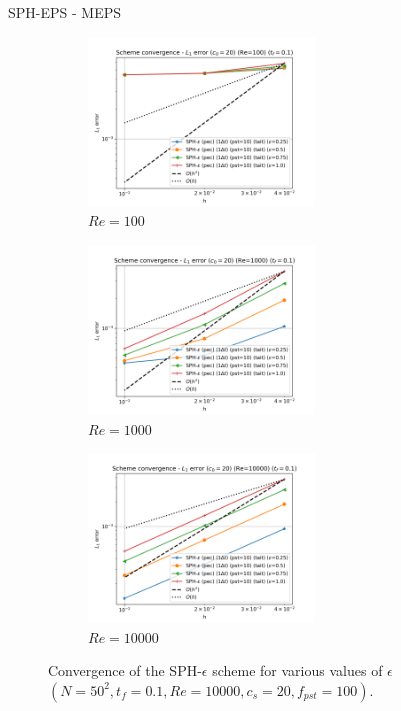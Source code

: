 SPH-EPS - MEPS 
\begin{figure}[H]
  \begin{subfigure}{7cm}
    \centering\includegraphics[width=6cm]{Code-Figures/mon2017/meps/dt_pois_conv_c0_20_re_100.png}
    \caption{$Re = 100$}
  \end{subfigure}
  \begin{subfigure}{7cm}
    \centering\includegraphics[width=6cm]{Code-Figures/mon2017/meps/dt_pois_conv_c0_20_re_1000.png}
    \caption{$Re = 1000$}
  \end{subfigure}
  \begin{subfigure}{7cm}
    \centering\includegraphics[width=6cm]{Code-Figures/mon2017/meps/dt_pois_conv_c0_20_re_10000.png}
    \caption{$Re = 10000$}
  \end{subfigure}
  \caption{Convergence of the SPH-$\epsilon$ scheme for various values of $\epsilon$  $(N=50^2, t_f=0.1, Re=10000, c_s=20, f_{pst}=100)$.}
  \label{fig:sph-eps-meps}
\end{figure}

